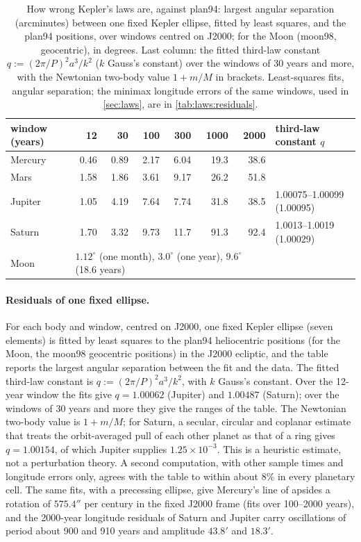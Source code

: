 \begin{table}[ht]
\centering\small
\caption{How wrong Kepler's laws are, against plan94: largest angular separation (arcminutes) between one fixed Kepler ellipse, fitted by least squares, and the plan94 positions, over windows centred on J2000; for the Moon (moon98, geocentric), in degrees. Last column: the fitted third-law constant $q:=(2\pi/P)^2a^3/k^2$ ($k$ Gauss's constant) over the windows of 30 years and more, with the Newtonian two-body value $1+m/M$ in brackets. Least-squares fits, angular separation; the minimax longitude errors of the same windows, used in \cref{sec:laws}, are in \cref{tab:laws:residuals}.}\label{tab:kepler:residuals}
\begin{tabular}{@{}lrrrrrrl@{}}
\toprule
window (years) & 12 & 30 & 100 & 300 & 1000 & 2000 & third-law constant $q$\\
\midrule
Mercury & 0.46 & 0.89 & 2.17 & 6.04 & 19.3 & 38.6 & \\
Mars & 1.58 & 1.86 & 3.61 & 9.17 & 26.2 & 51.8 & \\
Jupiter & 1.05 & 4.19 & 7.64 & 7.74 & 31.8 & 38.5 & 1.00075--1.00099 (1.00095)\\
Saturn & 1.70 & 3.32 & 9.73 & 11.7 & 91.3 & 92.4 & 1.0013--1.0019 (1.00029)\\
\midrule
Moon & \multicolumn{6}{l}{$1.12^\circ$ (one month), $3.0^\circ$ (one year), $9.6^\circ$ (18.6 years)} & \\
\bottomrule
\end{tabular}
\end{table}

\paragraph{Residuals of one fixed ellipse.} For each body and window, centred on J2000, one fixed Kepler ellipse (seven elements) is fitted by least squares to the plan94 heliocentric positions (for the Moon, the moon98 geocentric positions) in the J2000 ecliptic, and the table reports the largest angular separation between the fit and the data. The fitted third-law constant is $q:=(2\pi/P)^2a^3/k^2$, with $k$ Gauss's constant. Over the 12-year window the fits give $q=1.00062$ (Jupiter) and $1.00487$ (Saturn); over the windows of 30 years and more they give the ranges of the table. The Newtonian two-body value is $1+m/M$; for Saturn, a secular, circular and coplanar estimate that treats the orbit-averaged pull of each other planet as that of a ring gives $q=1.00154$, of which Jupiter supplies $1.25\times10^{-3}$. This is a heuristic estimate, not a perturbation theory. A second computation, with other sample times and longitude errors only, agrees with the table to within about $8\%$ in every planetary cell. The same fits, with a precessing ellipse, give Mercury's line of apsides a rotation of $575.4''$ per century in the fixed J2000 frame (fits over 100--2000 years), and the 2000-year longitude residuals of Saturn and Jupiter carry oscillations of period about 900 and 910 years and amplitude $43.8'$ and $18.3'$.

